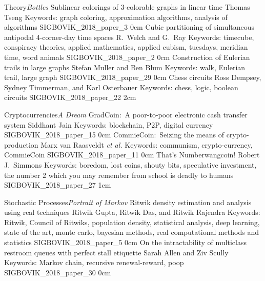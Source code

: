 \renewcommand{\thepage}{\roman{page}}
\setcounter{page}{3}



\newpage
\renewcommand{\thepage}{\arabic{page}}
\setcounter{page}{1}

\addtrack
	{Theory}{\textit{Bottles}}
\addpaper
	{Sublinear colorings of 3-colorable graphs in linear time}
	{Thomas Tseng}
	{Keywords: graph coloring, approximation algorithms, analysis of algorithms}
	{SIGBOVIK_2018_paper_3}
	{0cm}
	{}
\addpaper
	{Cubic partitioning of simultaneous antipodal 4-corner-day time spaces}
	{R.\ Welch and G.\ Ray}
	{Keywords: timecube, conspiracy theories, applied mathematics, applied cubism, tuesdays, meridian time, word animals}
	{SIGBOVIK_2018_paper_2}
	{0cm}
	{}
\addpaper
	{Construction of Eulerian trails in large graphs}
	{Stefan Muller and Ben Blum}
	{Keywords: walk, Eulerian trail, large graph}
	{SIGBOVIK_2018_paper_29}
	{0cm}
	{}
\addpaper
	{Chess circuits}
	{Ross Dempsey, Sydney Timmerman, and Karl Osterbauer}
	{Keywords: chess, logic, boolean circuits}
	{SIGBOVIK_2018_paper_22}
	{2cm}
	{}

\addtrack
	{Cryptocurrencies}{\textit{A Dream}}
\addpaper
	{GradCoin:\ A poor-to-poor electronic cash transfer system}
	{Siddhant Jain}
	{Keywords: blockchain, P2P, digital currency}
	{SIGBOVIK_2018_paper_15}
	{0cm}
	{}
\addpaper
	{CommieCoin:\ Seizing the means of crypto-production}
	{Marx van Raasveldt \textit{et al.}}
	{Keywords: communism, crypto-currency, CommieCoin}
	{SIGBOVIK_2018_paper_11}
	{0cm}
	{}
\addpaper
	{That's Numberwangcoin!}
	{Robert J.\ Simmons}
	{Keywords: boredom, lost coins, shouty bits, speculative investment, the number 2 which you may remember from school is deadly to humans}
	{SIGBOVIK_2018_paper_27}
	{1cm}
	{}

\addtrack
	{Stochastic Processes}{\textit{Portrait of Markov}}
\addpaper
	{Ritwik density estimation and analysis using real techniques}
	{Ritwik Gupta, Ritwik Das, and Ritwik Rajendra}
	{Keywords: Ritwik, Council of Ritwiks, population density, statistical analysis, deep learning, state of the art, monte carlo, bayesian methods, real computational methods and statistics}
	{SIGBOVIK_2018_paper_5}
	{0cm}
	{}
\addpaper
	{On the intractability of multiclass restroom queues with perfect stall etiquette}
	{Sarah Allen and Ziv Scully}
	{Keywords: Markov chain, recursive renewal-reward, poop}
	{SIGBOVIK_2018_paper_30}
	{0cm}
	{}

